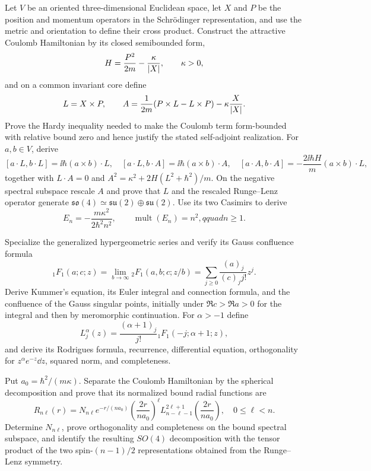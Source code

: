 \begin{exercise}
Let $V$ be an oriented three-dimensional Euclidean space, let $X$ and $P$ be
the position and momentum operators in the Schr\"odinger representation, and
use the metric and orientation to define their cross product.  Construct the
attractive Coulomb Hamiltonian by its closed semibounded form,
\[
 H=\frac{P^2}{2m}-\frac\kappa{\left\lvert X\right\rvert},\qquad \kappa>0,
\]
and on a common invariant core define
\[
 L=X\times P,
 \qquad
 A=\frac1{2m}(P\times L-L\times P)-\kappa\frac X{\left\lvert X\right\rvert}.
\]
Prove the Hardy inequality needed to make the Coulomb term form-bounded with
relative bound zero and hence justify the stated self-adjoint realization.
For $a,b\in V$, derive
\[
 [a\cdot L,b\cdot L]=\ii\hbar(a\times b)\cdot L,
 \quad [a\cdot L,b\cdot A]=\ii\hbar(a\times b)\cdot A,
 \quad [a\cdot A,b\cdot A]
 =-\frac{2\ii\hbar H}{m}(a\times b)\cdot L,
\]
together with $L\cdot A=0$ and
$A^2=\kappa^2+2H(L^2+\hbar^2)/m$.  On the negative spectral subspace rescale
$A$ and prove that $L$ and the rescaled Runge--Lenz operator generate
$\mathfrak{so}(4)\simeq\mathfrak{su}(2)\oplus\mathfrak{su}(2)$.  Use its two
Casimirs to derive
\[
 E_n=-\frac{m\kappa^2}{2\hbar^2n^2},
 \qquad \operatorname{mult}(E_n)=n^2,qquad n\geq1.
\]
\end{exercise}

\begin{exercise}
Specialize the generalized hypergeometric series and verify its Gauss
confluence formula
\[
 {}_1F_1(a;c;z)=\lim_{b\to\infty}{}_2F_1(a,b;c;z/b)
 =\sum_{j\geq0}\frac{(a)_j}{(c)_j j!}z^j.
\]
Derive Kummer's equation, its Euler integral and connection formula, and the
confluence of the Gauss singular points, initially under
$\Re c>\Re a>0$ for the integral and then by meromorphic continuation.  For
$\alpha>-1$ define
\[
 L_j^\alpha(z)=\frac{(\alpha+1)_j}{j!}
 {}_1F_1(-j;\alpha+1;z),
\]
and derive its Rodrigues formula, recurrence, differential equation,
orthogonality for $z^\alpha e^{-z}\dd z$, squared norm, and completeness.

Put $a_0=\hbar^2/(m\kappa)$.  Separate the Coulomb Hamiltonian by the
spherical decomposition and prove that its normalized bound radial functions
are
\[
 R_{n\ell}(r)=N_{n\ell}e^{-r/(na_0)}
 \left(\frac{2r}{na_0}\right)^\ell
 L_{n-\ell-1}^{2\ell+1}\!\left(\frac{2r}{na_0}\right),
 \quad 0\leq\ell<n.
\]
Determine $N_{n\ell}$, prove orthogonality and completeness on the bound
spectral subspace, and identify the resulting $SO(4)$ decomposition with the
tensor product of the two spin-$(n-1)/2$ representations obtained from the
Runge--Lenz symmetry.
\end{exercise}

